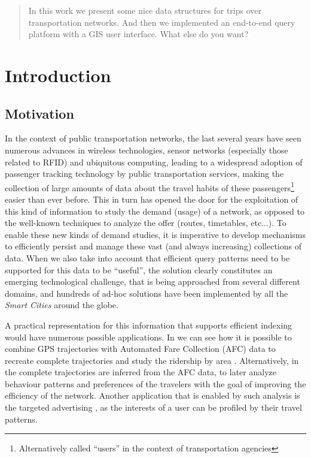 \documentclass{UniVieCS_PhD} %
\begin{document}
    \Titlepage %
    \clearpage
	
	\pagebreak

	\tableofcontents %
	
	\pagebreak
	
	\begin{abstract}
		In this work we present some nice data structures for trips over transportation networks. And then we implemented an end-to-end query platform with a GIS user interface. What else do you want?
	\end{abstract}
	
	\section{Introduction}
	\subsection{Motivation}
	In the context of public transportation networks, the last several years have seen numerous advances in wireless technologies, sensor networks (especially those related to RFID) and ubiquitous computing, leading to a widespread adoption of passenger tracking technology by public transportation services, making the collection of large amounts of data about the travel habits of these passengers\footnote{Alternatively called ``users'' in the context of transportation agencies} easier than ever before.
	This in turn has opened the door for the exploitation of this kind of information to study the demand (usage) of a network, as opposed to the well-known techniques to analyze the offer (routes, timetables, etc...). 
	To enable these new kinds of demand studies, it is imperative to develop mechanisms to efficiently persist and manage these vast (and always increasing) collections of data. When we also take into account that efficient query patterns need to be supported for this data to be ``useful'', the solution clearly constitutes an emerging technological challenge, that is being approached from several different domains, and hundreds of ad-hoc solutions have been implemented by all the \textit{Smart Cities} around the globe.
	
	A practical representation for this information that supports efficient indexing would have numerous possible applications. In \cite{tu2018spatial} we can see how it is possible to combine GPS trajectories with Automated Fare Collection (AFC) data to recreate complete trajectories and study the ridership by area \cite{tu2018spatial}. Alternatively, in \cite{weng2018mining} the complete trajectories are inferred from the AFC data, to later analyze behaviour patterns and preferences of the travelers with the goal of improving the efficiency of the network. Another application that is enabled by such analysis is the targeted advertising \cite{zhang2017targeted}, as the interests of a user can be profiled by their travel patterns.
	
\end{document}
